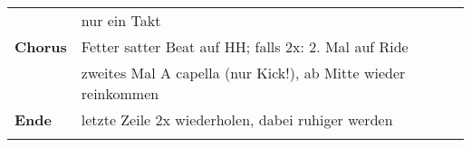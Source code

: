 \begin{tabular}{p{1.6cm}l}
                    & nur ein Takt                                                             \\
    \textbf{Chorus} & Fetter satter Beat auf HH; falls 2x: 2. Mal auf Ride                     \\
                    & zweites Mal A capella (nur Kick!), ab Mitte wieder reinkommen            \\
    \textbf{Ende}   & letzte Zeile 2x wiederholen, dabei ruhiger werden                        \\
                    &                                                                          \\
\end{tabular}
